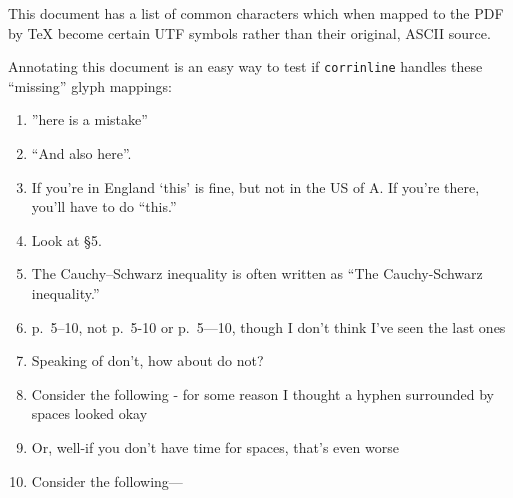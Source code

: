 \documentclass{amsart}
\begin{document}
This document has a list of common characters which when mapped to the PDF by \TeX{} become certain
UTF symbols rather than their original, ASCII source.

Annotating this document is an easy way to test if {\tt corrinline} handles these ``missing'' glyph mappings:

\begin{enumerate}[(1)]

\item ''here is a mistake''

\item ``And also here''.

\item If you're in England `this' is fine, but not in the US of A. If you're there, you'll have to do ``this.''

\item Look at \S 5.

\item The Cauchy--Schwarz inequality is often written as ``The Cauchy-Schwarz inequality.''

\item p.~5--10, not p.~5-10 or p.~5---10, though I don't think I've seen the last ones

\item Speaking of don't, how about do not?

\item Consider the following - for some reason I thought a hyphen surrounded by spaces looked okay

\item Or, well-if you don't have time for spaces, that's even worse

\item Consider the following---
\end{enumerate}
\end{document}
